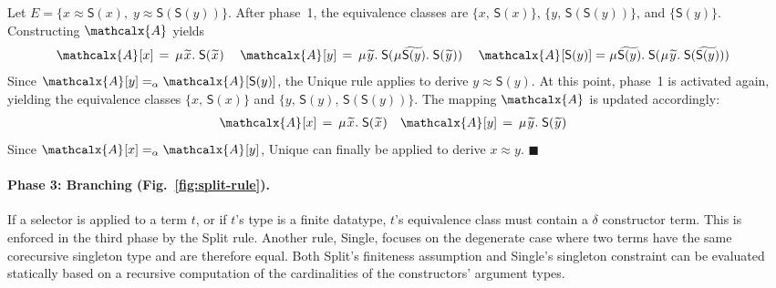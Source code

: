 \documentclass[smallcondensed,draft]{svjour3}
\newcommand\MU{\vvthinspace\mu\vvthinspace}
\newcommand\const[1]{\textsf{#1}}
\newcommand\xend{{\hfill$\scriptstyle\blacksquare$}}
\newcommand{\Ec}{E}
\newcommand{\tEc}{\Terms(\Ec)}
\newcommand{\rn}[1]{\textsf{#1}}
\newcommand{\teq}{\approx}
\newcommand{\ec}[1]{[#1]}
\newcommand{\Val}{\mathcalx{A}\vvthinspace}
\newcommand{\Varec}[1]{\vvthinspace\widetilde{#1}\vvthinspace}
\newcommand{\VAREC}[1]{\widetilde{\vphantom{\scriptstyle x^i}\smash{#1}}}
\newcommand{\aequiv}{\mathrel{=_\alpha}}
\newcommand\Terms{\mathcalx{T}}
\newcommand\vvthinspace{\kern+0.041667em}
\begin{document}

\begin{examplex}
Let $\Ec = \{ x \teq \const{S}(x),\; y \teq \const{S}(\const{S}(y)) \}$.
After phase~1, the equivalence classes %
are
$\{ x,\, \const{S}(x) \}$,
$\{ y,\, \const{S}(\const{S}(y)) \}$,
and $\{ \const{S}(y) \}$.
Constructing $\Val$ yields
\begin{align*}
\Val \ec{x} & \,=\, \MU {\Varec{x}}.\; \const{S}(\Varec{x}) &
\kern0.25em %
\Val \ec{y} & \,=\,
\MU {\Varec{y}}.\; \const{S}(\smash{\MU {\VAREC{\const{S}(y)}}}.\; \const{S}( {\Varec{y}} ) )
\kern0.25em %
 &
\Val \ec{\const{S}(y)} & =
\MU {\VAREC{\const{S}(y)}}.\; \const{S}(\MU {\Varec{y}}.\; \const{S}( {\VAREC{\const{S}(y)}} ) )
\end{align*}
Since $\Val \ec{y} \aequiv \Val \ec{\const{S}(y)}$,
the \rn{Unique} rule applies to derive $y \teq \const{S}(y)$.
%
At this point, phase~1 is activated again, %
yielding the equivalence classes
$\{ x,\, \const{S}(x) \}$ and
$\{ y,\, \const{S}(y),\allowbreak\, \const{S}(\const{S}(y)) \}$.
The mapping $\Val$ is updated accordingly:
\begin{align*}
\Val \ec{x} & \,=\, \MU {\Varec{x}}.\; \const{S}(\Varec{x})
&
\Val \ec{y} & \,=\, \MU {\Varec{y}}.\; \const{S}({\Varec{y}})
\end{align*}
Since $\Val \ec{x} \aequiv \Val \ec{y}$,
\rn{Unique} can finally be applied to derive $x \teq y$.
\xend
\end{examplex}

\paragraph{Phase 3: Branching \rm(Fig.~\ref{fig:split-rule}).}
If a selector is applied to a term $t$, or if $t$'s type is a finite datatype,
$t$'s equivalence class must contain a
$\delta$ constructor term.
This is enforced in the third phase by the \rn{Split} rule.
Another rule, \rn{Single}, focuses on the degenerate case where two
terms %
have the same corecursive singleton type
and are therefore equal. Both
\rn{Split}'s finiteness assumption %
and \rn{Single}'s singleton
constraint %
can be evaluated statically
based on a recursive computation of the cardinalities of the
constructors' argument types.
\end{document}
